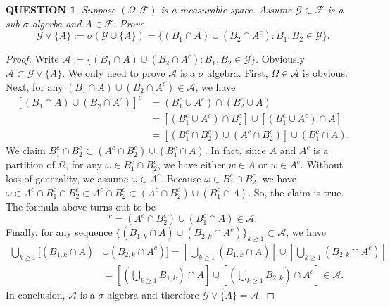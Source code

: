 \documentclass[12pt]{article}
\renewcommand{\(}{\left(}%
\renewcommand{\)}{\right)}%
\renewcommand{\[}{\left[}%
\renewcommand{\]}{\right]}%
\renewcommand{\a}{\mathscr{A}}
\newcommand{\f}{\mathscr{F}}
\newcommand{\g}{\mathscr{G}}
\newtheorem{question}{QUESTION}[section]}
\newtheorem{proof}{Proof.}}
\begin{document}
  \begin{question}
  	Suppose $(\Omega,\f)$ is a measurable space. Assume $\g\subset \f$ is a sub $\sigma$ algerba and $A\in\f$. Prove
  	\begin{equation*}
  		\g\vee\{A\}:=\sigma(\g\cup\{A\})=\{(B_1\cap A)\cup (B_2\cap A^c):B_1,B_2\in\g\}.
  	\end{equation*}
  \end{question}
  \begin{proof}
  	Write $\a:=\{(B_1\cap A)\cup (B_2\cap A^c):B_1,B_2\in\g\}$. Obviously $\a\subset \g\vee\{A\}$. We only need to prove $\a$ is a $\sigma$ algebra. First, $\Omega\in\a$ is obvious. Next, for any $(B_1\cap A)\cup (B_2\cap A^c)\in \a$, we have
  	\begin{equation*}
  		\begin{split}
  			[(B_1\cap A)\cup (B_2\cap A^c)]^c&=(B_1^c\cup A^c)\cap (B_2^c\cup A)\\
  			&=[(B_1^c\cup A^c)\cap B_2^c]\cup [(B_1^c\cup A^c)\cap A]\\
  			&=[(B_1^c\cap B_2^c)\cup (A^c\cap B_2^c)]\cup (B_1^c\cap A).
  		\end{split}
  	\end{equation*} 
  	We claim $B_1^c\cap B_2^c\subset (A^c\cap B_2^c)\cup (B_1^c\cap A)$. In fact, since $A$ and $A^c$ is a partition of $\Omega$, for any $\omega\in B_1^c\cap B_2^c$, we have either $w\in A$ or $w\in A^c$. Without loss of generality, we assume $\omega\in A^c$. Because $\omega\in B_1^c\cap B_2^c$, we have $\omega \in A^c\cap B_1^c\cap B_2^c\subset A^c\cap B_2^c\subset (A^c\cap B_2^c)\cup (B_1^c\cap A)$. So, the claim is true. The formula above turns out to be
  	\begin{equation*}
  		[(B_1\cap A)\cup (B_2\cap A^c)]^c=(A^c\cap B_2^c)\cup (B_1^c\cap A)\in \a.
  	\end{equation*}
  	Finally, for any sequence $\{(B_{1,k}\cap A)\cup (B_{2,k}\cap A^c)\}_{k\geq 1}\subset\a$, we have
  	\begin{equation*}
  		\begin{split}
  			\bigcup_{k\geq 1}[(B_{1,k}\cap A)&\cup (B_{2,k}\cap A^c)]=\[\bigcup_{k\geq 1}(B_{1,k}\cap A)\]\cup \[\bigcup_{k\geq 1}(B_{2,k}\cap A^c)\]\\
  			&=\[\(\bigcup_{k\geq 1}B_{1,k}\)\cap A\]\cup \[\(\bigcup_{k\geq 1}B_{2,k}\)\cap A^c\]\in\a.
  		\end{split}
  	\end{equation*} 
  	In conclusion, $\a$ is a $\sigma$ algebra and therefore $\g\vee\{A\}=\a$.
  \end{proof}
  
\end{document}
